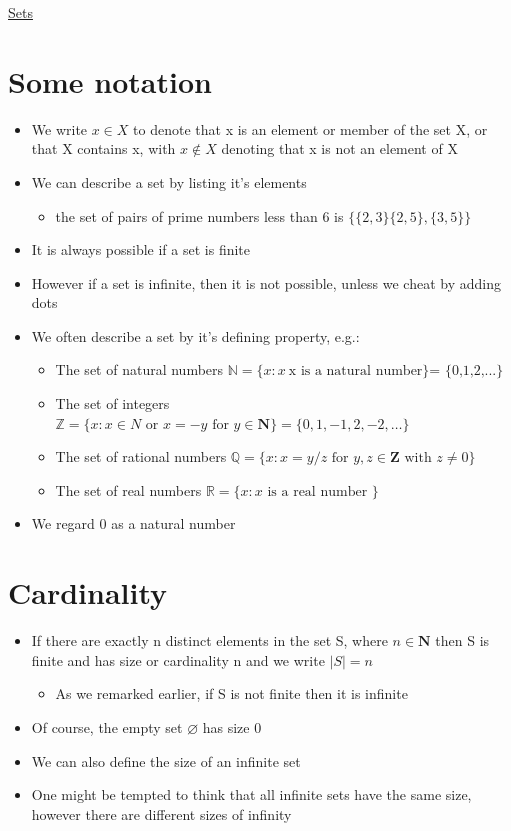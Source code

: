 \documentclass{article}[18pt]
\begin{document}
\begin{center}
\underline{\huge Sets}
\end{center}

\section{Some notation}
\begin{itemize}
	\item We write $x\in X$ to denote that x is an element or member of the set X, or that X contains x, with $x\notin X$ denoting that x is not an element of X
	\item We can describe a set by listing it's elements
	\begin{itemize}
		\item the set of pairs of prime numbers less than 6 is $\{\{2,3\}\{2,5\},\{3,5\}\}$
	\end{itemize}
	\item It is always possible if a set is finite
	\item However if a set is infinite, then it is not possible, unless we cheat by adding dots
	\item We often describe a set by it's defining property, e.g.:
	\begin{itemize}
		\item The set of natural numbers $\mathbb{N}=\{x: x \ \textrm{x is a natural number\} = \{0,1,2,...\}}$
		\item The set of integers $\mathbb{Z}=\{ x : x \in N \text { or } x = - y \text { for } y \in \mathbf { N } \} = \{ 0,1 , - 1,2 , - 2 , \ldots \}$
		\item The set of rational numbers $\mathbb{Q}=\{ x : x = y / z \text { for } y , z \in \mathbf { Z } \text { with } z \neq 0 \}$
		\item The set of real numbers $\mathbb{R}=\{ x : x \text { is a real number } \}$
	\end{itemize}
	\item We regard 0 as a natural number
\end{itemize}
\section{Cardinality}
\begin{itemize}
	\item If there are exactly n distinct elements in the set S, where $n\in \mathbf{ N }$ then S is finite and has size or cardinality n and we write $|S|=n$
	\begin{itemize}
		\item As we remarked earlier, if S is not finite then it is infinite
	\end{itemize}
	\item Of course, the empty set $\varnothing$ has size 0
	\item We can also define the size of an infinite set
	\item One might be tempted to think that all infinite sets have the same size, however there are different sizes of infinity
\end{itemize}
\end{document}
